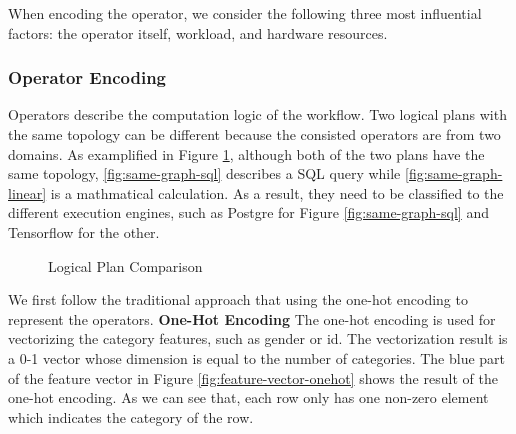When encoding the operator, we consider the following three most influential factors: the operator itself, workload, and hardware resources.

\subsubsection{Operator Encoding}
Operators describe the computation logic of the workflow.
Two logical plans with the same topology can be different because the consisted operators are from two domains.
As examplified in Figure \ref{fig:graph-comparison}, although both of the two plans have the same topology,
\ref{fig:same-graph-sql} describes a SQL query while \ref{fig:same-graph-linear} is a mathmatical calculation.
As a result, they need to be classified to the different execution engines, such as Postgre for Figure \ref{fig:same-graph-sql} and Tensorflow for the other.

\begin{figure}
  \caption{Logical Plan Comparison}
  \label{fig:graph-comparison}
\end{figure}

We first follow the traditional approach that using the one-hot encoding to represent the operators.
\textbf{One-Hot Encoding}
The one-hot encoding is used for vectorizing the category features, such as gender or id. 
The vectorization result is a 0-1 vector whose dimension is equal to the number of categories.
The blue part of the feature vector in Figure \ref{fig:feature-vector-onehot} shows the result of the one-hot encoding. 
As we can see that, each row only has one non-zero element which indicates the category of the row.

